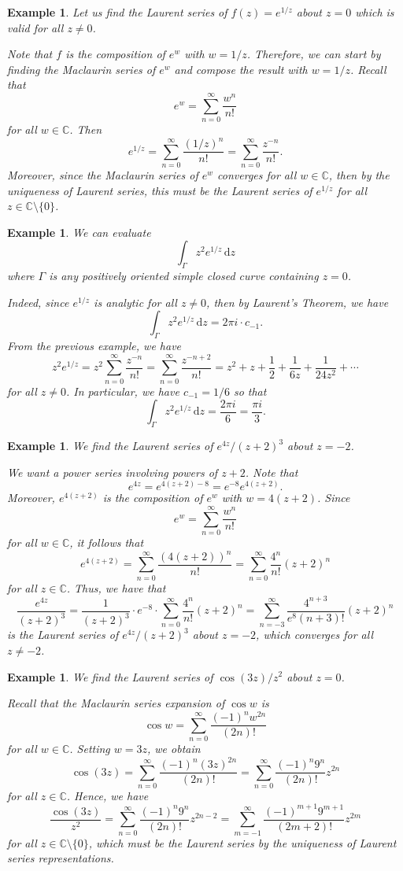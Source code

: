 \documentclass[10pt]{article}
\newcommand{\C}{\mathbb{C}}
\newcommand{\dd}{\,\mathrm{d}}
\theoremstyle{newstyle}
\newtheorem{exmp}[thm]{Example}
\begin{document}
\begin{exmp}
Let us find the Laurent series of $f(z) = e^{1/z}$ about $z = 0$ which is valid for all $z \neq 0$. 

Note that $f$ is the composition of $e^w$ with $w = 1/z$. Therefore, we can start by finding the 
Maclaurin series of $e^w$ and compose the result with $w = 1/z$. Recall that 
\[ e^w = \sum_{n=0}^\infty \frac{w^n}{n!} \]
for all $w \in \C$. Then 
\[ e^{1/z} = \sum_{n=0}^\infty \frac{(1/z)^n}{n!} = \sum_{n=0}^\infty \frac{z^{-n}}{n!}. \]
Moreover, since the Maclaurin series of $e^w$ converges for all $w \in \C$, then by the uniqueness 
of Laurent series, this must be the Laurent series of $e^{1/z}$ for all $z \in \C \setminus \{0\}$. 
\end{exmp}

\begin{exmp}
We can evaluate 
\[ \int_\Gamma z^2 e^{1/z} \dd z \]
where $\Gamma$ is any positively oriented simple closed curve containing $z = 0$. 

Indeed, since $e^{1/z}$ is analytic for all $z \neq 0$, then by Laurent's Theorem, we have 
\[ \int_\Gamma z^2e^{1/z} \dd z = 2\pi i \cdot c_{-1}. \]
From the previous example, we have 
\[ z^2 e^{1/z} = z^2 \sum_{n=0}^\infty \frac{z^{-n}}{n!} = \sum_{n=0}^\infty \frac{z^{-n+2}}{n!} 
= z^2 + z + \frac12 + \frac1{6z} + \frac{1}{24z^2} + \cdots \]
for all $z \neq 0$. In particular, we have $c_{-1} = 1/6$ so that 
\[ \int_\Gamma z^2 e^{1/z} \dd z = \frac{2\pi i}6 = \frac{\pi i}3. \]
\end{exmp}

\begin{exmp}
We find the Laurent series of $e^{4z}/(z+2)^3$ about $z = -2$. 

We want a power series involving powers of $z + 2$. Note that 
\[ e^{4z} = e^{4(z+2)-8} = e^{-8} e^{4(z+2)}. \]
Moreover, $e^{4(z+2)}$ is the composition of $e^w$ with $w = 4(z+2)$. Since 
\[ e^w = \sum_{n=0}^\infty \frac{w^n}{n!} \]
for all $w \in \C$, it follows that 
\[ e^{4(z+2)} = \sum_{n=0}^\infty \frac{(4(z+2))^n}{n!} = \sum_{n=0}^\infty \frac{4^n}{n!} (z+2)^n \]
for all $z \in \C$. Thus, we have that 
\[ \frac{e^{4z}}{(z+2)^3} = \frac{1}{(z+2)^3} \cdot e^{-8} \cdot \sum_{n=0}^\infty \frac{4^n}{n!}
(z+2)^n = \sum_{n=-3}^\infty \frac{4^{n+3}}{e^8(n+3)!}(z+2)^n \] 
is the Laurent series of $e^{4z}/(z+2)^3$ about $z = -2$, which converges for all $z \neq -2$. 
\end{exmp}

\begin{exmp}
We find the Laurent series of $\cos(3z)/z^2$ about $z = 0$. 

Recall that the Maclaurin series expansion of $\cos w$ is 
\[ \cos w = \sum_{n=0}^\infty \frac{(-1)^n w^{2n}}{(2n)!} \]
for all $w \in \C$. Setting $w = 3z$, we obtain 
\[ \cos(3z) = \sum_{n=0}^\infty \frac{(-1)^n (3z)^{2n}}{(2n)!} = \sum_{n=0}^\infty \frac{(-1)^n 9^n}{(2n)!} z^{2n} \]
for all $z \in \C$. Hence, we have 
\[ \frac{\cos(3z)}{z^2} = \sum_{n=0}^\infty \frac{(-1)^n 9^n}{(2n)!} z^{2n-2} 
= \sum_{m=-1}^\infty \frac{(-1)^{m+1} 9^{m+1}}{(2m+2)!} z^{2m} \]
for all $z \in \C \setminus \{0\}$, which must be the Laurent series by the uniqueness of 
Laurent series representations. 
\end{exmp}
\end{document}
